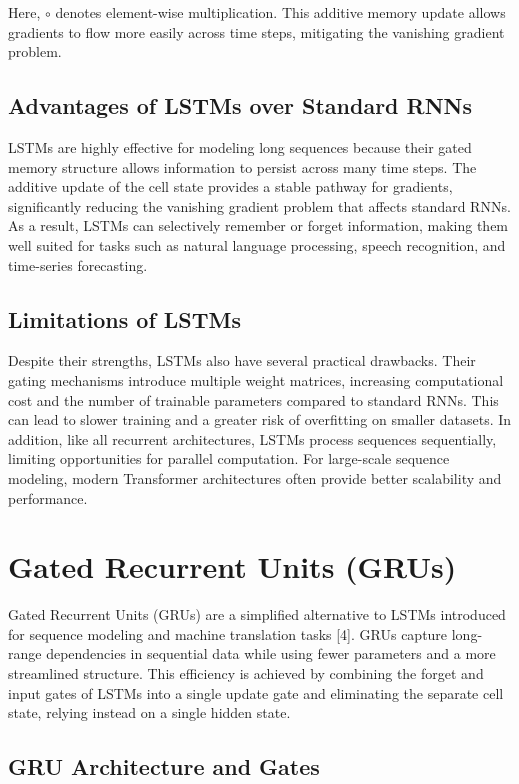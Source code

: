\documentclass{article}
\renewcommand{\cite}[1]{[#1]}
\begin{document}
Here, \( \circ \) denotes element-wise multiplication.  
This additive memory update allows gradients to flow more easily across time steps, mitigating the vanishing gradient problem.

\subsection{Advantages of LSTMs over Standard RNNs}

LSTMs are highly effective for modeling long sequences because their gated memory structure allows information to persist across many time steps. The additive update of the cell state provides a stable pathway for gradients, significantly reducing the vanishing gradient problem that affects standard RNNs. As a result, LSTMs can selectively remember or forget information, making them well suited for tasks such as natural language processing, speech recognition, and time-series forecasting.

\subsection{Limitations of LSTMs}

Despite their strengths, LSTMs also have several practical drawbacks. Their gating mechanisms introduce multiple weight matrices, increasing computational cost and the number of trainable parameters compared to standard RNNs. This can lead to slower training and a greater risk of overfitting on smaller datasets. In addition, like all recurrent architectures, LSTMs process sequences sequentially, limiting opportunities for parallel computation. For large-scale sequence modeling, modern Transformer architectures often provide better scalability and performance.

\section{Gated Recurrent Units (GRUs)}

Gated Recurrent Units (GRUs) are a simplified alternative to LSTMs introduced for sequence modeling and machine translation tasks \cite{4}. GRUs capture long-range dependencies in sequential data while using fewer parameters and a more streamlined structure. This efficiency is achieved by combining the forget and input gates of LSTMs into a single update gate and eliminating the separate cell state, relying instead on a single hidden state.

\subsection{GRU Architecture and Gates}
\end{document}
